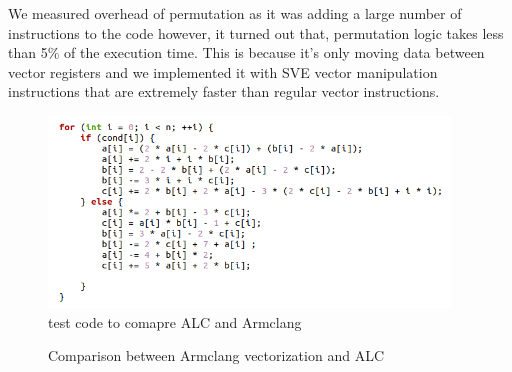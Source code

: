 \documentclass[\main/thesis.tex]{subfiles}
\begin{document}
We measured overhead of permutation as it was adding a large number of instructions to the code however, it turned out that, permutation logic takes less than 5\% of the execution time. This is because it's only moving data between vector registers and we implemented it with SVE vector manipulation instructions that are extremely faster than regular vector instructions.


\begin{figure}[t!]
    \centering
    \includegraphics[width=0.95\textwidth]{img/test.png}
    \caption{test code to comapre ALC and Armclang}
    \label{fig:iterative_alc}
\end{figure}


\begin{figure}%
    \centering
    \qquad
    \caption{Comparison between Armclang vectorization and ALC}%
    \label{fig:example}%
\end{figure}
\end{document}

